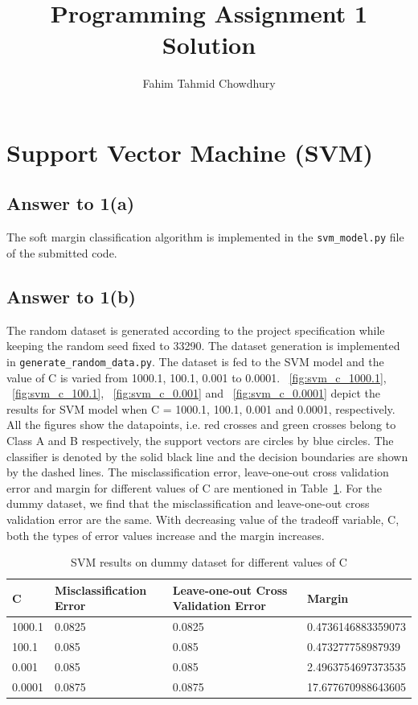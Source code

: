 \documentclass[runningheads]{llncs}
\begin{document}
%
\title{Programming Assignment 1 Solution}
\author{Fahim Tahmid Chowdhury}
\maketitle              %
%

\section{Support Vector Machine (SVM)}
\subsection{Answer to 1(a)}
The soft margin classification algorithm is implemented in the \texttt{svm\_model.py} file of the submitted code.

\subsection{Answer to 1(b)}
The random dataset is generated according to the project specification while keeping the random seed fixed to 33290.
The dataset generation is implemented in \texttt{generate\_random\_data.py}.
The dataset is fed to the SVM model and the value of C is varied from 1000.1, 100.1, 0.001 to 0.0001.
\figurename~\ref{fig:svm_c_1000.1}, \figurename~\ref{fig:svm_c_100.1}, \figurename~\ref{fig:svm_c_0.001} and
\figurename~\ref{fig:svm_c_0.0001} depict the results for SVM model when C = 1000.1, 100.1, 0.001 and 0.0001, respectively.
All the figures show the datapoints, i.e. red crosses and green crosses belong to Class A and B respectively,
the support vectors are circles by blue circles. The classifier is denoted by the solid black line and the decision boundaries are shown by the dashed lines.
The misclassification error, leave-one-out cross validation error and margin for different values of C are mentioned in Table~\ref{tab:table_C}.
For the dummy dataset, we find that the misclassification and leave-one-out cross validation error are the same. With decreasing
value of the tradeoff variable, C, both the types of error values increase and the margin increases.

\begin{table}
\caption{SVM results on dummy dataset for different values of C}\label{tab:table_C}
\begin{tabular}{|l|l|l|l|}
\hline
C &  Misclassification Error & Leave-one-out Cross Validation Error & Margin\\
\hline
1000.1 & 0.0825 & 0.0825 & 0.4736146883359073\\
100.1 & 0.085 & 0.085 & 0.473277758987939\\
0.001 & 0.085 & 0.085 & 2.4963754697373535\\
0.0001 & 0.0875 & 0.0875 & 17.677670988643605\\
\hline
\end{tabular}
\end{table}
\end{document}
